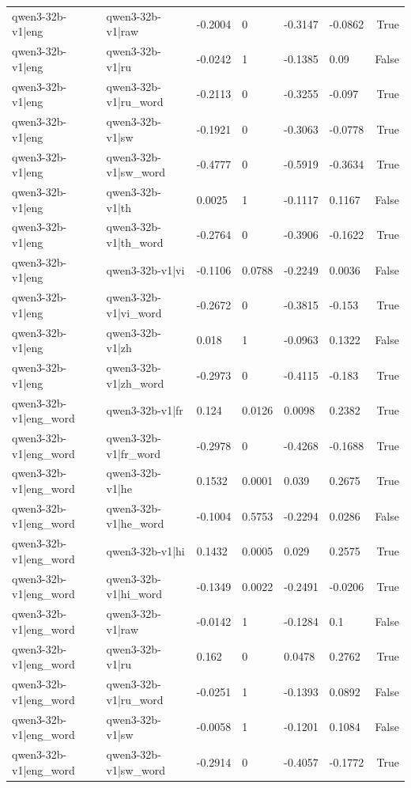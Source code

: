 \begin{table}
\begin{tabular}{llllllr}
qwen3-32b-v1|eng & qwen3-32b-v1|raw & -0.2004 & 0 & -0.3147 & -0.0862 & True \\
qwen3-32b-v1|eng & qwen3-32b-v1|ru & -0.0242 & 1 & -0.1385 & 0.09 & False \\
qwen3-32b-v1|eng & qwen3-32b-v1|ru_word & -0.2113 & 0 & -0.3255 & -0.097 & True \\
qwen3-32b-v1|eng & qwen3-32b-v1|sw & -0.1921 & 0 & -0.3063 & -0.0778 & True \\
qwen3-32b-v1|eng & qwen3-32b-v1|sw_word & -0.4777 & 0 & -0.5919 & -0.3634 & True \\
qwen3-32b-v1|eng & qwen3-32b-v1|th & 0.0025 & 1 & -0.1117 & 0.1167 & False \\
qwen3-32b-v1|eng & qwen3-32b-v1|th_word & -0.2764 & 0 & -0.3906 & -0.1622 & True \\
qwen3-32b-v1|eng & qwen3-32b-v1|vi & -0.1106 & 0.0788 & -0.2249 & 0.0036 & False \\
qwen3-32b-v1|eng & qwen3-32b-v1|vi_word & -0.2672 & 0 & -0.3815 & -0.153 & True \\
qwen3-32b-v1|eng & qwen3-32b-v1|zh & 0.018 & 1 & -0.0963 & 0.1322 & False \\
qwen3-32b-v1|eng & qwen3-32b-v1|zh_word & -0.2973 & 0 & -0.4115 & -0.183 & True \\
qwen3-32b-v1|eng_word & qwen3-32b-v1|fr & 0.124 & 0.0126 & 0.0098 & 0.2382 & True \\
qwen3-32b-v1|eng_word & qwen3-32b-v1|fr_word & -0.2978 & 0 & -0.4268 & -0.1688 & True \\
qwen3-32b-v1|eng_word & qwen3-32b-v1|he & 0.1532 & 0.0001 & 0.039 & 0.2675 & True \\
qwen3-32b-v1|eng_word & qwen3-32b-v1|he_word & -0.1004 & 0.5753 & -0.2294 & 0.0286 & False \\
qwen3-32b-v1|eng_word & qwen3-32b-v1|hi & 0.1432 & 0.0005 & 0.029 & 0.2575 & True \\
qwen3-32b-v1|eng_word & qwen3-32b-v1|hi_word & -0.1349 & 0.0022 & -0.2491 & -0.0206 & True \\
qwen3-32b-v1|eng_word & qwen3-32b-v1|raw & -0.0142 & 1 & -0.1284 & 0.1 & False \\
qwen3-32b-v1|eng_word & qwen3-32b-v1|ru & 0.162 & 0 & 0.0478 & 0.2762 & True \\
qwen3-32b-v1|eng_word & qwen3-32b-v1|ru_word & -0.0251 & 1 & -0.1393 & 0.0892 & False \\
qwen3-32b-v1|eng_word & qwen3-32b-v1|sw & -0.0058 & 1 & -0.1201 & 0.1084 & False \\
qwen3-32b-v1|eng_word & qwen3-32b-v1|sw_word & -0.2914 & 0 & -0.4057 & -0.1772 & True \\

\end{tabular}
\end{table}
